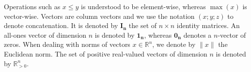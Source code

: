 Operations such as $x \leq y$ is understood to be element-wise, whereas $\max(x)$ is vector-wise. Vectors are column vectors and we use the notation $(x; y; z)$ to denote concatenation. It is denoted by $\mathbf{I_n}$ the set of $n \times n$ identity matrices. An all-ones vector of dimension $n$ is denoted by $\mathbf{1_n}$, whereas $\mathbf{0_n}$ denotes a $n$-vector of zeros. When dealing with norms of vectors $x \in \mathbb{R}^n$, we denote by $\|x\|$ the Euclidean norm. The set of positive real-valued vectors of dimension $n$ is denoted by $\mathbb{R}^n_{>0}$.